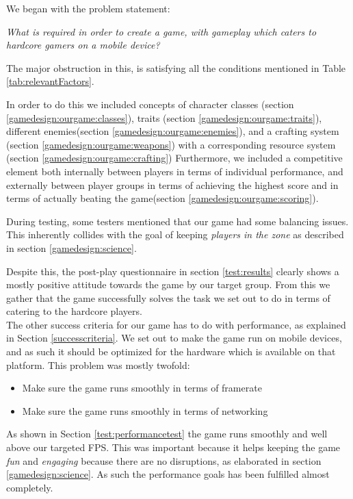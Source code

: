 We began with the problem statement:
\begin{center}
\textit{What is required in order to create a game, with gameplay which caters to hardcore gamers on a mobile device?}
\end{center}

The major obstruction in this, is satisfying all the conditions mentioned in Table \ref{tab:relevantFactors}.

In order to do this we included concepts of character classes (section \ref{gamedesign:ourgame:classes}), traits (section \ref{gamedesign:ourgame:traits}), different enemies(section \ref{gamedesign:ourgame:enemies}), and a crafting system (section \ref{gamedesign:ourgame:weapons}) with a corresponding resource system (section \ref{gamedesign:ourgame:crafting})
Furthermore, we included a competitive element both internally between players in terms of individual performance, and externally between player groups in terms of achieving the highest score and in terms of actually beating the game(section \ref{gamedesign:ourgame:scoring}).

During testing, some testers mentioned that our game had some balancing issues. 
This inherently collides with the goal of keeping \emph{players in the zone} as described in section \ref{gamedesign:science}. 

Despite this, the post-play questionnaire in section \ref{test:results} clearly shows a mostly positive attitude towards the game by our target group.
From this we gather that the game successfully solves the task we set out to do in terms of catering to the hardcore players.\\

The other success criteria for our game has to do with performance, as explained in Section \ref{successcriteria}.
We set out to make the game run on mobile devices, and as such it should be optimized for the hardware which is available on that platform. 
This problem was mostly twofold:

\begin{itemize}
\item Make sure the game runs smoothly in terms of framerate 
\item Make sure the game runs smoothly in terms of networking
\end{itemize}

As shown in Section \ref{test:performancetest} the game runs smoothly and well above our targeted FPS.
This was important because it helps keeping the game \emph{fun} and \emph{engaging} because there are no disruptions, as elaborated in section \ref{gamedesign:science}.
As such the performance goals has been fulfilled almost completely.